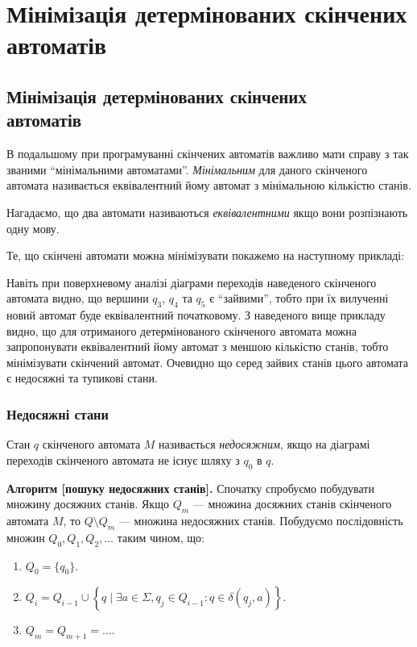 \setcounter{section}{2}

\section{Мінімізація детермінованих скінчених \texorpdfstring{\\}{} автоматів}

\subsection{Мінімізація детермінованих скінчених \texorpdfstring{\\}{} автоматів}

В подальшому при програмуванні скінчених автоматів важливо мати справу з так званими  ``мінімальними автоматами''. \textit{Мінімальним} для даного скінченого автомата називається еквівалентний йому автомат з мінімальною кількістю станів. \medskip

Нагадаємо, що два автомати називаються \textit{еквівалентними} якщо вони розпізнають одну мову. \medskip

Те, що скінчені автомати можна мінімізувати покажемо на наступному прикладі:
\begin{figure}[H]
	\centering
	
\end{figure}

Навіть при поверхневому аналізі діаграми переходів наведеного скінченого автомата видно, що вершини $q_3$, $q_4$ та $q_5$ є ``зайвими'', тобто при їх вилученні новий автомат буде еквівалентний початковому. З наведеного вище прикладу видно, що для отриманого детермінованого скінченого автомата можна запропонувати еквівалентний йому автомат з меншою кількістю станів, тобто мінімізувати скінчений автомат. Очевидно що серед зайвих станів цього автомата є недосяжні та тупикові стани.

\subsubsection{Недосяжні стани}

Стан $q$ скінченого автомата $M$ називається \textit{недосяжним}, якщо на діаграмі переходів скінченого автомата не існує шляху з $q_0$ в $q$. \medskip

\textbf{Алгоритм [пошуку недосяжних станів].} Спочатку спробуємо побудувати множину досяжних станів. Якщо $Q_m$ --- множина досяжних станів скінченого автомата $M$, то $Q \setminus Q_m$ --- множина недосяжних станів. Побудуємо послідовність множин $Q_0, Q_1, Q_2, \ldots$ таким чином, що:
\begin{enumerate}
	\item $Q_0 = \{q_0\}$.
	\item $Q_i = Q_{i-1} \cup \left\{ q \mid \exists a \in \Sigma, q_j \in Q_{i - 1}: q \in \delta(q_j, a) \right\}$.
	\item $Q_m = Q_{m+1} = \ldots$.
\end{enumerate}

